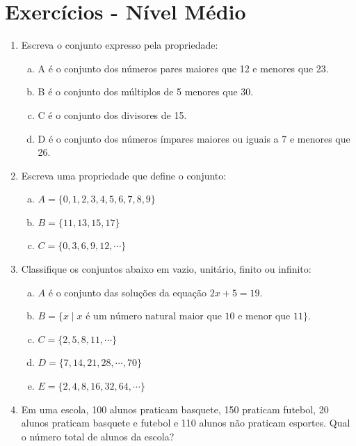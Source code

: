 \newpage
\section{Exercícios - Nível Médio}

\begin{enumerate}
 \item Escreva o conjunto expresso pela propriedade:
 \begin{enumerate}[a)]
  \item A é o conjunto dos números pares maiores que 12 e menores que 23.
   \vskip0.5cm
   
  \item B é o conjunto dos múltiplos de 5 menores que 30.
   \vskip0.5cm
   
  \item C é o conjunto dos divisores de 15.
   \vskip0.5cm
   
  \item D é o conjunto dos números ímpares maiores ou iguais a 7 e menores que 26.
   \vskip0.5cm
 \end{enumerate}
 
 \item Escreva uma propriedade que define o conjunto:
 \begin{enumerate}[a)]
  \item $A=\{0, 1, 2, 3, 4, 5, 6, 7, 8, 9\}$
   \vskip0.5cm
  \item $B=\{11, 13, 15, 17\}$
   \vskip0.5cm
  \item $C=\{0,3,6,9,12, \cdots \}$
 \end{enumerate}
 
 \item Classifique os conjuntos abaixo em vazio, unitário, finito ou infinito:
 \begin{enumerate}[a)]
  \item $A$ é o conjunto das soluções da equação $2x+5=19$.
   \vskip0.5cm
  \item $B = \{x \mid x \text{ é um número natural maior que 10 e menor que 11}\}$.
   \vskip0.5cm
  \item $C = \{2,5,8,11, \cdots \}$
   \vskip0.5cm
  \item $D= \{7, 14, 21, 28, \cdots, 70\}$
   \vskip0.5cm
  \item $E= \{2,4,8,16,32,64, \cdots \}$
   \vskip0.5cm
 \end{enumerate}
 
 \item Em uma escola, 100 alunos praticam basquete, 150 praticam futebol, 20 alunos praticam basquete e futebol e 110 alunos não praticam esportes. Qual o número total de alunos da escola?
 

\end{enumerate}
